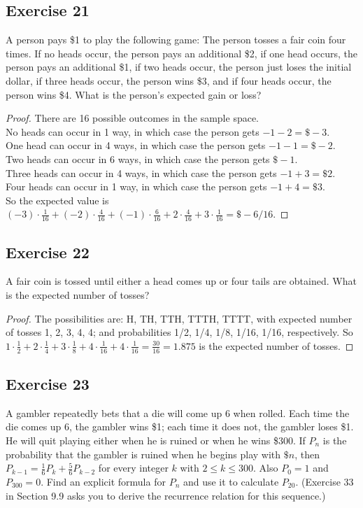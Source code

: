 \documentclass[14pt]{extarticle}
\begin{document}
\subsection{Exercise 21}
A person pays \$1 to play the following game: The person tosses a fair coin four times. If no heads occur, the person
pays an additional \$2, if one head occurs, the person pays an additional \$1, if two heads occur, the person just loses the
initial dollar, if three heads occur, the person wins \$3, and if four heads occur, the person wins \$4. What is the person’s
expected gain or loss?

\begin{proof}
     There are 16 possible outcomes in the sample space. \\
     No heads can occur in 1 way, in which case the person gets \(-1-2 = \$-3\). \\
     One head can occur in 4 ways, in which case the person gets \(-1-1 = \$-2\). \\
     Two heads can occur in 6 ways, in which case the person gets \(\$-1\). \\
     Three heads can occur in 4 ways, in which case the person gets \(-1+3 = \$2\). \\
     Four heads can occur in 1 way, in which case the person gets \(-1+4= \$3\). \\
     So the expected value is \((-3) \cdot \frac{1}{16} + (-2) \cdot \frac{4}{16} + (-1) \cdot \frac{6}{16} + 2 \cdot
     \frac{4}{16} + 3 \cdot \frac{1}{16} = \$-6/16.\)
\end{proof}

\subsection{Exercise 22}
A fair coin is tossed until either a head comes up or four tails are obtained. What is the expected number of tosses?

\begin{proof}
     The possibilities are: H, TH, TTH, TTTH, TTTT, with expected number of tosses 1, 2, 3, 4, 4; and probabilities 1/2, 1/4,
     1/8, 1/16, 1/16, respectively. So \(1 \cdot \frac{1}{2} + 2 \cdot \frac{1}{4} + 3 \cdot \frac{1}{8} + 4 \cdot \frac{1}{16}
     + 4 \cdot \frac{1}{16} = \frac{30}{16} = 1.875\) is the expected number of tosses.
\end{proof}

\subsection{Exercise 23}
A gambler repeatedly bets that a die will come up 6 when rolled. Each time the die comes up 6, the gambler wins \$1;
each time it does not, the gambler loses \$1. He will quit playing either when he is ruined or when he wins \$300. If
\(P_n\) is the probability that the gambler is ruined when he begins play with \(\$n\), then \(P_{k-1} = \frac{1}{6}P_k +
\frac{5}{6} P_{k-2}\) for every integer \(k\) with \(2 \leq k \leq 300\). Also \(P_0 = 1\) and \(P_{300} = 0\). Find an
explicit formula for \(P_n\) and use it to calculate \(P_{20}\). (Exercise 33 in Section 9.9 asks you to derive the
recurrence relation for this sequence.)
\end{document}
